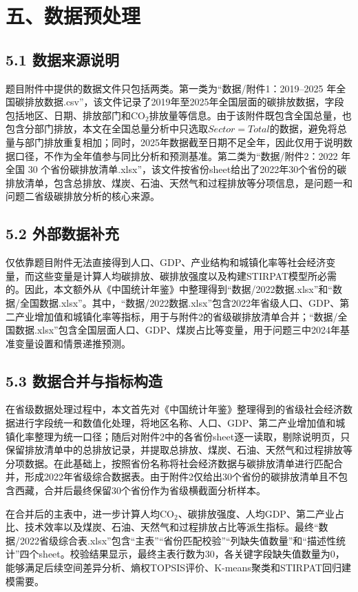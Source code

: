 \documentclass[UTF8,zihao=-4,fontset=fandol]{ctexart}
\begin{document}
\section*{五、数据预处理}

\subsection*{5.1 数据来源说明}

题目附件中提供的数据文件只包括两类。第一类为“数据/附件1：2019--2025 年全国碳排放数据.csv”，该文件记录了2019年至2025年全国层面的碳排放数据，字段包括地区、日期、排放部门和CO$_2$排放量等信息。由于该附件既包含全国总量，也包含分部门排放，本文在全国总量分析中只选取$Sector=Total$的数据，避免将总量与部门排放重复相加；同时，2025年数据截至日期不足全年，因此仅用于说明数据口径，不作为全年值参与同比分析和预测基准。第二类为“数据/附件2：2022 年全国 30 个省份碳排放清单.xlsx”，该文件按省份sheet给出了2022年30个省份的碳排放清单，包含总排放、煤炭、石油、天然气和过程排放等分项信息，是问题一和问题二省级碳排放分析的核心来源。

\subsection*{5.2 外部数据补充}

仅依靠题目附件无法直接得到人口、GDP、产业结构和城镇化率等社会经济变量，而这些变量是计算人均碳排放、碳排放强度以及构建STIRPAT模型所必需的。因此，本文额外从《中国统计年鉴》中整理得到“数据/2022数据.xlsx”和“数据/全国数据.xlsx”。其中，“数据/2022数据.xlsx”包含2022年省级人口、GDP、第二产业增加值和城镇化率等指标，用于与附件2的省级碳排放清单合并；“数据/全国数据.xlsx”包含全国层面人口、GDP、煤炭占比等变量，用于问题三中2024年基准变量设置和情景递推预测。

\subsection*{5.3 数据合并与指标构造}

在省级数据处理过程中，本文首先对《中国统计年鉴》整理得到的省级社会经济数据进行字段统一和数值化处理，将地区名称、人口、GDP、第二产业增加值和城镇化率整理为统一口径；随后对附件2中的各省份sheet逐一读取，剔除说明页，只保留排放清单中的总排放记录，并提取总排放、煤炭、石油、天然气和过程排放等分项数据。在此基础上，按照省份名称将社会经济数据与碳排放清单进行匹配合并，形成2022年省级综合数据表。由于附件2仅给出30个省份的碳排放清单且不包含西藏，合并后最终保留30个省份作为省级横截面分析样本。

在合并后的主表中，进一步计算人均CO$_2$、碳排放强度、人均GDP、第二产业占比、技术效率以及煤炭、石油、天然气和过程排放占比等派生指标。最终“数据/2022省级综合表.xlsx”包含“主表”“省份匹配校验”“列缺失值数量”和“描述性统计”四个sheet。校验结果显示，最终主表行数为30，各关键字段缺失值数量为0，能够满足后续空间差异分析、熵权TOPSIS评价、K-means聚类和STIRPAT回归建模需要。
\end{document}
